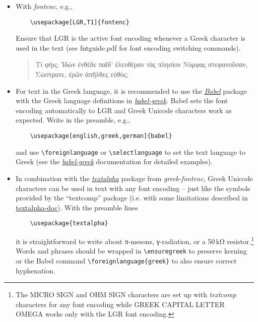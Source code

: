 \documentclass[a4paper]{article}
\begin{document}
\begin{itemize}

\item With \emph{fontenc}, e.g.,
  \begin{verbatim}
    \usepackage[LGR,T1]{fontenc}
\end{verbatim}
  Ensure that LGR is the active font encoding whenever a Greek character is
  used in the text (see fntguide.pdf for font encoding switching commands).
  \begin{quote}
    \greekscript
    Τί φήις; Ἱδὼν ἐνθέδε παῖδ’ ἐλευθέραν
    τὰς πλησίον Νύμφας στεφανοῦσαν, Σώστρατε,
    ἐρῶν άπῆλθες εὐθύς;
  \end{quote}

\item For text in the Greek language, it is recommended to use the
  \href{https://ctan.org/pkg/babel}{\emph{Babel}} package with the Greek
  language definitions in
  \href{https://ctan.org/pkg/babel-greek}{\emph{babel-greek}}.
  Babel sets the font encoding automatically to LGR and Greek Unicode
  characters work as expected. Write in the preamble, e.g.,
  \begin{verbatim}
    \usepackage[english,greek,german]{babel}
\end{verbatim}
  and use \verb+\foreignlanguage+ or \verb+\selectlanguage+ to set the text
  language to Greek (see the
  \href{https://ctan.org/pkg/babel-greek}{\emph{babel-greek}} documentation
  for detailed examples).

\item In combination with the
  \href{http://mirrors.ctan.org/language/greek/greek-fontenc/textalpha.sty.html}%
  {\emph{textalpha}} package from \emph{greek-fontenc}, Greek Unicode
  characters can be used in text with any font encoding -- just like the
  symbols provided by the ``textcomp'' package (i.e. with some limitations
  described in
  \href{https://mirrors.ctan.org/language/greek/greek-fontenc/textalpha-doc.pdf}
  {textalpha-doc}).
\makeatletter
\ifdefined\textalpha@define@breathings %
  With the preamble lines
  \begin{verbatim}
    \usepackage{textalpha}
\end{verbatim}
  it is straightforward to write about π-mesons, γ-radiation, or a 50\,kΩ
  resistor.\footnote{%
    The MICRO SIGN and OHM SIGN characters are set up with
    \emph{textcomp} characters for any font encoding while
    GREEK CAPITAL LETTER OMEGA works only with the LGR font encoding.}
  Words and phrases should be wrapped in \verb|\ensuregreek| to preserve
  kerning or the Babel command \verb|\foreignlanguage{greek}| to also
  ensure correct hyphenation.


\end{itemize}
\end{document}
